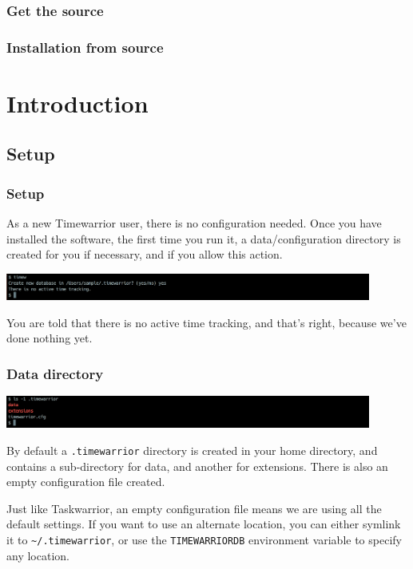 \documentclass[t,handout]{beamer}
\begin{document}
\begin{frame}[fragile]\frametitle{Get the source}
\end{frame}

\begin{frame}[fragile]\frametitle{Installation from source}
\end{frame}

\section{Introduction}

\subsection{Setup}

\begin{frame}[fragile]\frametitle{Setup}
    As a new Timewarrior user, there is no configuration needed. Once you have installed the software, the first time you run it, a data/configuration directory is created for you if necessary, and if you allow this action.

    \includegraphics[width=12cm]{images/tutorial1.png}

    You are told that there is no active time tracking, and that's right, because we've done nothing yet.
\end{frame}

\begin{frame}[fragile]\frametitle{Data directory}
    \includegraphics[width=12cm]{images/tutorial2.png}

    By default a \verb=.timewarrior= directory is created in your home directory, and contains a sub-directory for data, and another for extensions. There is also an empty configuration file created.

    Just like Taskwarrior, an empty configuration file means we are using all the default settings. If you want to use an alternate location, you can either symlink it to \verb=~/.timewarrior=, or use the \verb=TIMEWARRIORDB= environment variable to specify any location.
\end{frame}
\end{document}
